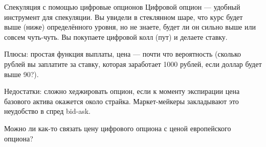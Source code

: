 \documentclass{beamer}
\newcommand{\usdrubstrike}{90}
\begin{document}
\begin{frame}{Спекуляция с помощью цифровые опционов}
\justify
Цифровой опцион --- удобный инструмент для спекуляции. Вы увидели в стеклянном шаре,
что курс будет выше (ниже) определённого уровня, но не знаете, будет ли он сильно выше
или совсем чуть-чуть. Вы покупаете цифровой колл (пут) и делаете ставку.

\justify
Плюсы: простая функция выплаты, цена --- почти что вероятность (сколько рублей вы 
заплатите за ставку, которая заработает 1000 рублей, если доллар будет выше \usdrubstrike?). 

\justify
Недостатки: сложно хеджировать опцион, если к моменту экспирации цена базового актива окажется около страйка. Маркет-мейкеры закладывают это неудобство в спред bid-ask.

\justify
Можно ли как-то связать цену цифрового опциона с ценой европейского опциона?
\end{frame}

\newcommand{\leftstrikeA}{89.5}
\newcommand{\leftstrikeB}{89.75}
\newcommand{\leftstrikeC}{89.95}
\newcommand{\rightstrikeA}{90.5}
\newcommand{\rightstrikeB}{90.25}
\newcommand{\rightstrikeC}{90.05}
\end{document}
